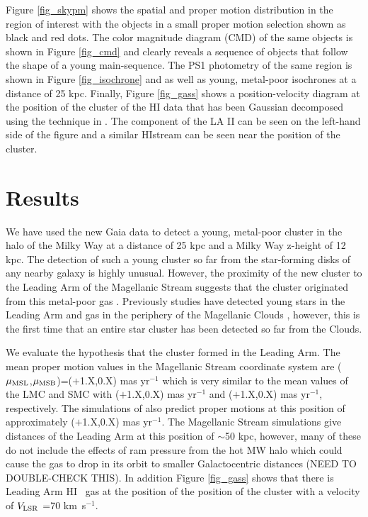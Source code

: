 \documentclass[modern]{aastex62}
\newcommand{\kmse}{\mbox{km s$^{-1}$}}
\newcommand{\vlsr}{$V_{\rm LSR}~$}
\newcommand{\hi}{H{\footnotesize I} }
\newcommand{\hie}{H{\footnotesize I}}
\begin{document}
Figure \ref{fig_skypm} shows the spatial and proper motion distribution in the region of interest with the objects in
a small proper motion selection shown as black and red dots.  The color magnitude diagram (CMD) of the same objects
is shown in Figure \ref{fig_cmd} and clearly reveals a sequence of objects that follow the shape of a young main-sequence.
The PS1 photometry of the same region is shown in Figure \ref{fig_isochrone} and as well as young, metal-poor isochrones at
a distance of 25 kpc.  Finally, Figure \ref{fig_gass} shows a position-velocity diagram at the position of the cluster of the \citep[GASS;][]{McClure-Griffiths2009} \hi data that has been Gaussian decomposed using the technique in \citet{Nidever2008}.
The component of the LA II can be seen on the left-hand side of the figure and a similar \hie stream can be seen near the
position of the cluster.


\section{Results} \label{sec:results}

We have used the new Gaia data to detect a young, metal-poor cluster in the halo of the Milky Way at a distance of 25 kpc and
a Milky Way z-height of 12 kpc.  The detection of such a young cluster so far from the star-forming disks of any nearby
galaxy is highly unusual.  However, the proximity of the new cluster to the Leading Arm of the Magellanic Stream suggests
that the cluster originated from this metal-poor gas \citep{Fox2018}.  Previously studies have detected young stars in the Leading Arm and gas in the periphery of the Magellanic Clouds \citep{Casetti-Dinescu2014,MoniBidin2017}, however, this is the first time
that an entire star cluster has been detected so far from the Clouds.

We evaluate the hypothesis that the cluster formed in the Leading Arm.  The mean proper motion values in the Magellanic Stream
coordinate system \citep{Nidever2008} are ($\mu_{\rm MSL}$,$\mu_{\rm MSB}$)=($+$1.X,0.X) mas yr$^{-1}$ which is very similar to the
mean values of the LMC and SMC with ($+$1.X,0.X) mas yr$^{-1}$ and ($+$1.X,0.X) mas yr$^{-1}$, respectively.  The simulations
of \citet{Besla:2012} also predict proper motions at this position of approximately ($+$1.X,0.X) mas yr$^{-1}$.  The Magellanic Stream
simulations give distances of the Leading Arm at this position of $\sim$50 kpc, however, many of these do not include the
effects of ram pressure from the hot MW halo which could cause the gas to drop in its orbit to smaller Galactocentric
distances (NEED TO DOUBLE-CHECK THIS).  In addition Figure \ref{fig_gass} shows that there is Leading Arm \hi~gas at the
position of the position of the cluster with a velocity of \vlsr=70 \kmse.
\end{document}
